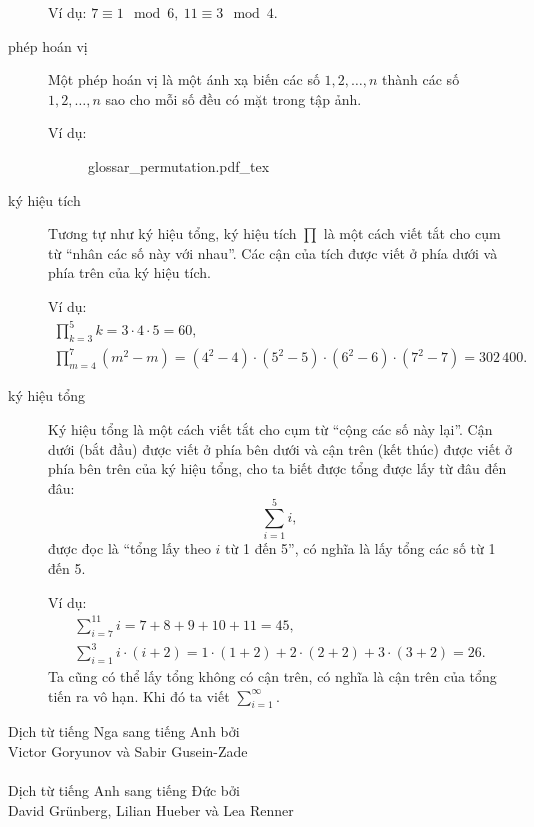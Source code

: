 \begin{description}
		Ví dụ: $7\equiv 1 \mod 6,\ 11\equiv 3\mod 4$.

	\item[phép hoán vị] Một phép hoán vị là một ánh xạ biến các số $1,2,\dotsc,n$ thành các số $1,2,\dotsc,n$ sao cho mỗi số đều có mặt trong tập ảnh.

		Ví dụ:
		\begin{figure}
			\def\svgwidth{200pt}
			{glossar_permutation.pdf_tex}
		\end{figure}
	
	\item[ký hiệu tích] Tương tự như ký hiệu tổng, ký hiệu tích $\prod$ là một cách viết tắt cho cụm từ \enquote{nhân các số này với nhau}. Các cận của tích được viết ở phía dưới và phía trên của ký hiệu tích.

		Ví dụ:
		\begin{gather*}
			\prod\limits_{k=3}^5 k = 3\cdot 4\cdot 5 = 60,\\
			\prod\limits_{m=4}^7 (m^2 - m) = (4^2-4)\cdot(5^2-5)\cdot (6^2-6) \cdot (7^2-7)= 302\,400.
		\end{gather*}
	\item[ký hiệu tổng] Ký hiệu tổng là một cách viết tắt cho cụm từ \enquote{cộng các số này lại}. Cận dưới (bắt đầu) được viết ở phía bên dưới và cận trên (kết thúc) được viết ở phía bên trên của ký hiệu tổng, cho ta biết được tổng được lấy từ đâu đến đâu:		
		\begin{equation*}
			\sum\limits_{i=1}^5 i,
		\end{equation*}
		được đọc là \enquote{tổng lấy theo $i$ từ 1 đến 5}, có nghĩa là lấy tổng các số từ 1 đến 5.

		Ví dụ:
		\begin{gather*}
			\sum\limits_{i=7}^{11} i= 7+8+9+10+11 = 45,\\
			\sum\limits_{i=1}^3 i\cdot (i+2) = 1\cdot (1+2) + 2\cdot (2+2) + 3\cdot (3+2) = 26.
		\end{gather*}
		Ta cũng có thể lấy tổng không có cận trên, có nghĩa là cận trên của tổng tiến ra vô hạn. Khi đó ta viết $\sum\limits_{i=1}^\infty$.
\end{description}
\clearpage
\null\vfill
\noindent
Dịch từ tiếng Nga sang tiếng Anh bởi \\
\null\quad Victor Goryunov và Sabir Gusein-Zade\\
\\
Dịch từ tiếng Anh sang tiếng Đức bởi \\
\null\quad David Grünberg, Lilian Hueber và Lea Renner\\
